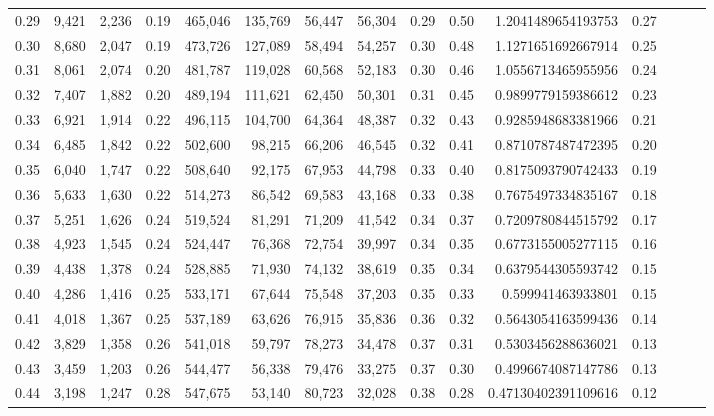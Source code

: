 \begin{tabular}{rrrrrrrrrrrrrrr}
0.29 &   9,421 &  2,236 &  0.19 &  465,046 &  135,769 &   56,447 &   56,304 &  0.29 &  0.50 &    1.2041489654193753 &      0.27 \\
0.30 &   8,680 &  2,047 &  0.19 &  473,726 &  127,089 &   58,494 &   54,257 &  0.30 &  0.48 &    1.1271651692667914 &      0.25 \\
0.31 &   8,061 &  2,074 &  0.20 &  481,787 &  119,028 &   60,568 &   52,183 &  0.30 &  0.46 &    1.0556713465955956 &      0.24 \\
0.32 &   7,407 &  1,882 &  0.20 &  489,194 &  111,621 &   62,450 &   50,301 &  0.31 &  0.45 &    0.9899779159386612 &      0.23 \\
0.33 &   6,921 &  1,914 &  0.22 &  496,115 &  104,700 &   64,364 &   48,387 &  0.32 &  0.43 &    0.9285948683381966 &      0.21 \\
0.34 &   6,485 &  1,842 &  0.22 &  502,600 &   98,215 &   66,206 &   46,545 &  0.32 &  0.41 &    0.8710787487472395 &      0.20 \\
0.35 &   6,040 &  1,747 &  0.22 &  508,640 &   92,175 &   67,953 &   44,798 &  0.33 &  0.40 &    0.8175093790742433 &      0.19 \\
0.36 &   5,633 &  1,630 &  0.22 &  514,273 &   86,542 &   69,583 &   43,168 &  0.33 &  0.38 &    0.7675497334835167 &      0.18 \\
0.37 &   5,251 &  1,626 &  0.24 &  519,524 &   81,291 &   71,209 &   41,542 &  0.34 &  0.37 &    0.7209780844515792 &      0.17 \\
0.38 &   4,923 &  1,545 &  0.24 &  524,447 &   76,368 &   72,754 &   39,997 &  0.34 &  0.35 &    0.6773155005277115 &      0.16 \\
0.39 &   4,438 &  1,378 &  0.24 &  528,885 &   71,930 &   74,132 &   38,619 &  0.35 &  0.34 &    0.6379544305593742 &      0.15 \\
0.40 &   4,286 &  1,416 &  0.25 &  533,171 &   67,644 &   75,548 &   37,203 &  0.35 &  0.33 &     0.599941463933801 &      0.15 \\
0.41 &   4,018 &  1,367 &  0.25 &  537,189 &   63,626 &   76,915 &   35,836 &  0.36 &  0.32 &    0.5643054163599436 &      0.14 \\
0.42 &   3,829 &  1,358 &  0.26 &  541,018 &   59,797 &   78,273 &   34,478 &  0.37 &  0.31 &    0.5303456288636021 &      0.13 \\
0.43 &   3,459 &  1,203 &  0.26 &  544,477 &   56,338 &   79,476 &   33,275 &  0.37 &  0.30 &    0.4996674087147786 &      0.13 \\
0.44 &   3,198 &  1,247 &  0.28 &  547,675 &   53,140 &   80,723 &   32,028 &  0.38 &  0.28 &   0.47130402391109616 &      0.12 \\

\end{tabular}
